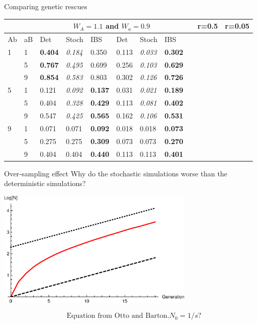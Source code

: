 \documentclass{beamer}
\begin{document}
\begin{frame}{Comparing genetic rescues}

\begin{tabular}{l | l | lll | lll}
&  & \multicolumn{6}{c}{$W_A=1.1$ and $W_a = 0.9$}
&  & \multicolumn{3}{c}{r=0.5} & \multicolumn{3}{c}{r=0.05} \\
\midrule
Ab& aB & Det & Stoch & IBS & Det & Stoch & IBS \\
\midrule
1 & 1 & \textbf{0.404} &\textit{0.184}& 0.350         & 0.113 & \textit{0.033} & \textbf{0.302} \\
     & 5 & \textbf{0.767} & \textit{0.495} & 0.699   & 0.256 & \textit{0.103} & \textbf{0.629}  \\
     & 9 & \textbf{0.854} & \textit{0.583} & 0.803   & 0.302 & \textit{0.126} &  \textbf{0.726}\\
     \midrule
5 & 1 & 0.121 & \textit{0.092} &  \textbf{0.137}         & 0.031 & \textit{0.021} & \textbf{0.189} \\
     & 5 & 0.404 & \textit{0.328} & \textbf{0.429}       & 0.113 & \textit{0.081} & \textbf{0.402}\\
     & 9 & 0.547 & \textit{0.425} & \textbf{0.565}    & 0.162 & \textit{0.106} & \textbf{0.531} \\
     \midrule
9 & 1 & 0.071 & 0.071 & \textbf{0.092}         & 0.018 & 0.018 & \textbf{0.073}\\
     & 5 & 0.275 & 0.275 & \textbf{0.309}  & 0.073 & 0.073 & \textbf{0.270}  \\
     & 9 & 0.404 & 0.404 & \textbf{0.440}   & 0.113 & 0.113 & \textbf{0.401} \\
\end{tabular}
\end{frame}

\begin{frame}{Over-sampling effect}
    Why do the stochastic simulations worse than the deterministic simulations?
    \vfill

\includegraphics[width=0.7\textwidth]{Rfiles/figures/PlotSimGrowth.eps}

\begin{equation*}
   \text{ Equation from Otto and Barton.} N_0 = 1/s ?
\end{equation*}
    
\end{frame}
\end{document}
